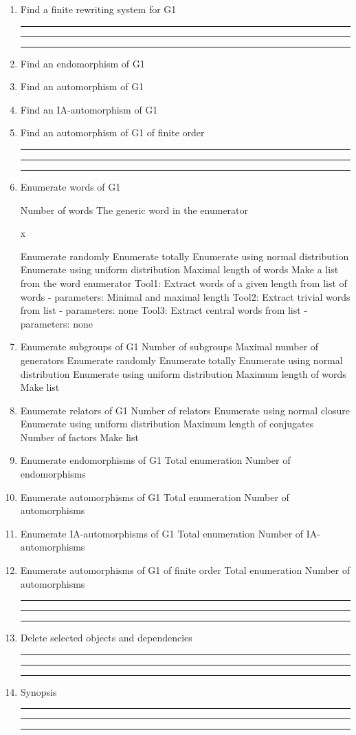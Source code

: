 \begin{enumerate}
\bigskip
\hrule\hrule\hrule
\item Find a finite rewriting system for G1

\bigskip
\hrule\hrule\hrule

\item Find an endomorphism of G1

\item Find an automorphism of G1

\item Find an IA-automorphism of G1

\item Find an automorphism of G1 of finite order

\bigskip
\hrule\hrule\hrule
\item Enumerate words of G1

\subitem Number of words
\subsubitem The generic word in the enumerator

\hskip 2.0in    x

\subsubitem Enumerate randomly
\subsubitem Enumerate totally
\subsubitem Enumerate using normal distribution
\subsubitem Enumerate using uniform distribution
\subsubitem Maximal length of words
\bigskip
\subitem Make a list from the word enumerator
\subsubitem Tool1: Extract words of a given length
from list of words - parameters: Minimal and maximal length
\subsubitem Tool2: Extract trivial words from list - parameters: none
\subsubitem Tool3: Extract central words from list - parameters: none
\bigskip
\item Enumerate subgroups of G1
\subitem Number of subgroups
\subitem Maximal number of generators
\subsubitem Enumerate randomly
\subsubitem Enumerate totally
\subsubitem Enumerate using normal distribution
\subsubitem Enumerate using uniform distribution
\subsubitem Maximum length of words
\bigskip
\subitem Make list
\bigskip
\item Enumerate relators of G1
\subitem Number of relators
\subsubitem Enumerate using normal closure
\subsubitem Enumerate using uniform distribution
\subsubitem Maximum length of conjugates
\subsubitem Number of factors
\subitem Make list

\bigskip
\item Enumerate endomorphisms of G1
\subitem Total enumeration
\subsubitem Number of endomorphisms

 \bigskip
\item Enumerate automorphisms of G1
\subitem Total enumeration
\subsubitem Number of automorphisms

\bigskip
\item Enumerate IA-automorphisms of G1
\subitem Total enumeration
\subsubitem Number of IA-automorphisms

\bigskip
\item Enumerate automorphisms of G1 of finite order
\subitem Total enumeration \subsubitem Number of automorphisms
\bigskip
\hrule\hrule\hrule

\item Delete selected objects and dependencies

\bigskip
\hrule\hrule\hrule

\item
Synopsis

\bigskip
\hrule\hrule\hrule

\end{enumerate}
